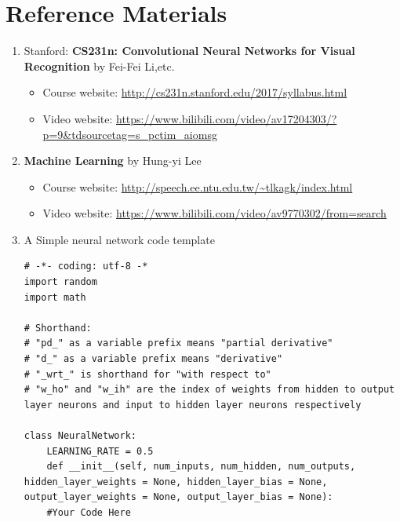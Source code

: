 \documentclass[a4paper, 11pt]{article}
\begin{document}
\section{Reference Materials}
\begin{enumerate}
	\item Stanford: \textbf{CS231n: Convolutional Neural Networks for Visual Recognition} by Fei-Fei Li,etc.
	\begin{itemize}
		\item Course website: \url{http://cs231n.stanford.edu/2017/syllabus.html}
		\item Video website: \url{https://www.bilibili.com/video/av17204303/?p=9&tdsourcetag=s_pctim_aiomsg}
	\end{itemize}
	
	\item \textbf{Machine Learning} by Hung-yi Lee
	\begin{itemize}
		\item Course website: \url{http://speech.ee.ntu.edu.tw/~tlkagk/index.html}
		\item Video website: \url{https://www.bilibili.com/video/av9770302/from=search}
	\end{itemize}
	\item A Simple neural network code template
	\begin{lstlisting}
# -*- coding: utf-8 -*
import random
import math

# Shorthand:
# "pd_" as a variable prefix means "partial derivative"
# "d_" as a variable prefix means "derivative"
# "_wrt_" is shorthand for "with respect to"
# "w_ho" and "w_ih" are the index of weights from hidden to output layer neurons and input to hidden layer neurons respectively

class NeuralNetwork:
    LEARNING_RATE = 0.5
    def __init__(self, num_inputs, num_hidden, num_outputs, hidden_layer_weights = None, hidden_layer_bias = None, output_layer_weights = None, output_layer_bias = None):
    #Your Code Here


\end{lstlisting}
\end{enumerate}
\end{document}
